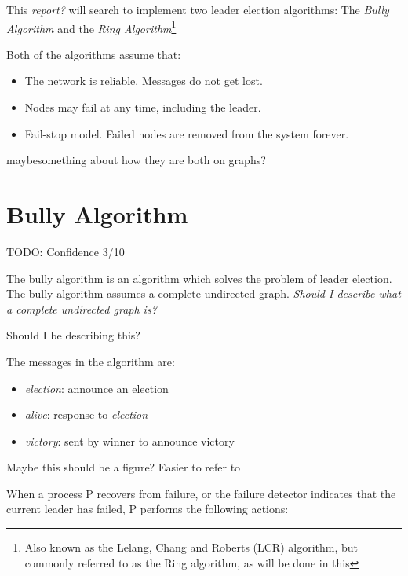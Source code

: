 \documentclass{report}
\begin{document}
This \textit{report?} will search to implement two leader election algorithms: The \textit{Bully Algorithm} and the \textit{Ring Algorithm}\footnote{Also known as the Lelang, Chang and Roberts (LCR) algorithm, but commonly referred to as the Ring algorithm, as will be done in this }

Both of the algorithms assume that:
\begin{itemize}
  \item The network is reliable. Messages do not get lost.
  \item Nodes may fail at any time, including the leader.
  \item Fail-stop model. Failed nodes are removed from the system forever.
\end{itemize}

\begin{callout}
  maybesomething about how they are both on graphs?
  \end{callout}


\section{Bully Algorithm}
\begin{callout}
TODO: Confidence 3/10
\end{callout}

The bully algorithm is an algorithm which solves the problem of leader election. The bully algorithm assumes a complete undirected graph.\cite{marco}
\textit{Should I describe what a complete undirected graph is?}

\begin{callout}
Should I be describing this?
\end{callout}

The messages in the algorithm are:
\begin{itemize}
  \item \textit{election}: announce an election
  \item \textit{alive}: response to \textit{election}
  \item \textit{victory}: sent by winner to announce victory
\end{itemize}

\begin{callout}
  Maybe this should be a figure? Easier to refer to
  \end{callout}
When a process P recovers from failure, or the failure detector indicates that the current leader has failed, P performs the following actions:
\end{document}
